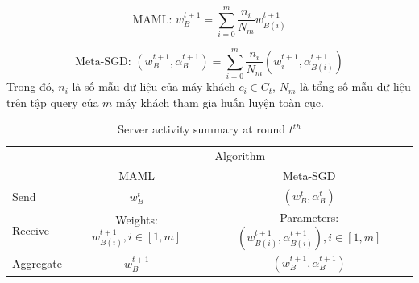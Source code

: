 \documentclass[runningheads]{llncs}
\begin{document}
\begin{dmath}
    \text{MAML: } w_{B}^{t+1} = \sum_{i=0}^m \frac{n_i}{N_m} w_{B(i)}^{t+1}
\end{dmath}

\begin{dmath}
    \text{Meta-SGD: } (w_B^{t+1}, \alpha_B^{t+1}) = \sum_{i=0}^m \frac{n_i}{N_m} (w_i^{t+1}, \alpha_{B(i)}^{t+1})
\end{dmath} Trong đó, $n_i$ là số mẫu dữ liệu của máy khách $c_i\in C_t$, $N_m$ là tổng số mẫu dữ liệu trên tập query của $m$ máy khách tham gia huấn luyện toàn cục.

\begin{table}[h]
    \centering
    \caption{Server activity summary at round $t^{th}$}
    \label{tab:param_fedmetaper}
    \begin{tabular}{l|c|c} 
    \toprule
    \multirow{2}{*}{} & \multicolumn{2}{c}{Algorithm}                                               \\ 
    \cline{2-3}
                      & MAML                          & Meta-SGD                                     \\ 
    \hline
    Send              & $w_B^t$                                & $(w_B^t, \alpha_B^t)$                        \\
    Receive           & Weights: $w_{B(i)}^{t+1}, i\in [1,m]$  & Parameters: $(w_{B(i)}^{t+1}, \alpha_{B(i)}^{t+1}), i\in [1,m]$  \\
    Aggregate         & $w_{B}^{t+1}$                          & $(w_B^{t+1}, \alpha_B^{t+1})$                    \\
    \bottomrule
    \end{tabular}
\end{table}
\end{document}
